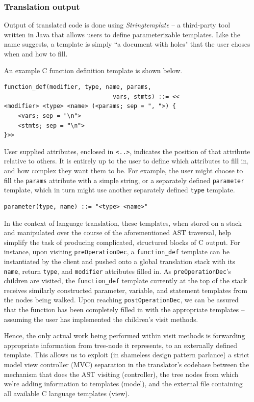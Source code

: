 \subsubsection{Translation output}
Output of translated code is done using \textit{Stringtemplate} -- a third-party tool written in Java that allows users to define parameterizable templates. Like the name suggests, a template is simply ``a document with holes" that the user choses when and how to fill. 

An example C function definition template is shown below.

\begin{verbatim}
function_def(modifier, type, name, params, 
                               vars, stmts) ::= <<
<modifier> <type> <name> (<params; sep = ", ">) {
    <vars; sep = "\n">
    <stmts; sep = "\n">
}>>
\end{verbatim}

User supplied attributes, enclosed in \texttt{<..>}, indicates the position of that attribute relative to others. It is entirely up to the user to define which attributes to fill in, and how complex they want them to be. For example, the user might choose to fill the \texttt{params} attribute with a simple string, or a separately defined \texttt{parameter} template, which in turn might use another separately defined \texttt{type} template.

\begin{verbatim}
parameter(type, name) ::= "<type> <name>"
\end{verbatim}

In the context of language translation, these templates, when stored on a stack and manipulated over the course of the aforementioned AST traversal, help simplify the task of producing complicated, structured blocks of C output. For instance, upon visiting \texttt{preOperationDec}, a \texttt{function\_def} template can be instantiated by the client and pushed onto a global translation stack with its \texttt{name}, return \texttt{type}, and \texttt{modifier} attributes filled in. As \texttt{preOperationDec}'s children are visited, the \texttt{function\_def} template currently at the top of the stack receives similarly constructed parameter, variable, and statement templates from the nodes being walked. Upon reaching \texttt{postOperationDec}, we can be assured that the function has been completely filled in with the appropriate templates -- assuming the user has implemented the children's visit methods.

Hence, the only actual work being performed within visit methods is forwarding appropriate information from tree-node it represents, to an externally defined template. This allows us to exploit (in shameless design pattern parlance) a strict model view controller (MVC) separation in the translator's codebase between the mechanism that does the AST visiting (controller), the tree nodes from which we're adding information to templates (model), and the external file containing all available C language templates (view).

